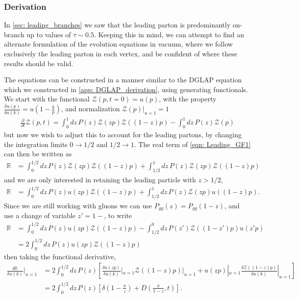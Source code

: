 \documentclass[main.tex]{subfiles}
\begin{document}
\subsubsection*{Derivation}
In \autoref{sec: leading_branches} we saw that the leading parton is predominantly on-branch up to values of \(\tau \sim 0.5\). Keeping this in mind, we can attempt to find an alternate formulation of the evolution equations in vacuum, where we follow exclusively the leading parton in each vertex, and be confident of where these results should be valid.

The equations can be constructed in a manner similar to the DGLAP equation which we constructed in \autoref{app: DGLAP_derivation}, using generating functionals. We start with the functional \(\mathcal{Z}(p,t=0) = u(p)\), with the property \(\frac{\delta u(p)}{\delta u(k)} = u(1-\frac{k}{p})\), and normalization \(\mathcal{Z}(p)|_{u=1} = 1\)
\begin{align}\label{eqn: Leading_GF1}
    \frac{\partial}{\partial t} \mathcal{Z}(p,t) = \int_0^1 dz \, P(z) \mathcal{Z}(zp)\mathcal{Z}((1-z)p) - \int_0^1 dz\, P(z) \mathcal{Z}(p)
\end{align}
but now we wish to adjust this to account for the leading partons, by changing the integration limits \(0\rightarrow 1/2\) and \(1/2\rightarrow 1\). The real term of \autoref{eqn: Leading_GF1} can then be written as
\begin{align}
    \mathbb{R} &= \int_0^{1/2} dz \, P(z) \mathcal{Z}(zp)\mathcal{Z}((1-z)p) + \int_{1/2}^1 dz \, P(z) \mathcal{Z}(zp)\mathcal{Z}((1-z)p)
\end{align}
and we are only interested in retaining the leading particle with \(z>1/2\),
\begin{align}
    \mathbb{R} &= \int_0^{1/2} dz \, P(z) u(zp)\mathcal{Z}((1-z)p) + \int_{1/2}^1 dz \, P(z) \mathcal{Z}(zp)u((1-z)p).
\end{align}
Since we are still working with gluons we can use \(P_{gg}(z) = P_{gg}(1-z)\), and use a change of variable \(z'=1-\), to write
\begin{align}
    \mathbb{R} &= \int_0^{1/2} dz \, P(z) u(zp)\mathcal{Z}((1-z)p) - \int_{1/2}^0 dz \, P(z') \mathcal{Z}((1-z')p)u(z'p) \nonumber\\
    &= 2\int_0^{1/2} dz \, P(z) u(zp)\mathcal{Z}((1-z)p) 
\end{align}
then taking the functional derivative,
\begin{align}
    \frac{\delta \mathbb{R}}{\delta u(k)}|_{u=1} &= 2\int_0^{1/2} dz \, P(z) \left[\frac{\delta u(zp)}{\delta u(k)}|_{u=1} \mathcal{Z}((1-z)p)|_{u=1} + u(zp)|_{u=1} \frac{\delta \mathcal{Z}((1-z)p)}{\delta u(k)}|_{u=1} \right] \nonumber \\
    &= 2\int_0^{1/2} dz \, P(z) \left[\delta(1-\frac{x}{z}) + D(\frac{x}{1-z},t) \right].
\end{align}
\end{document}
